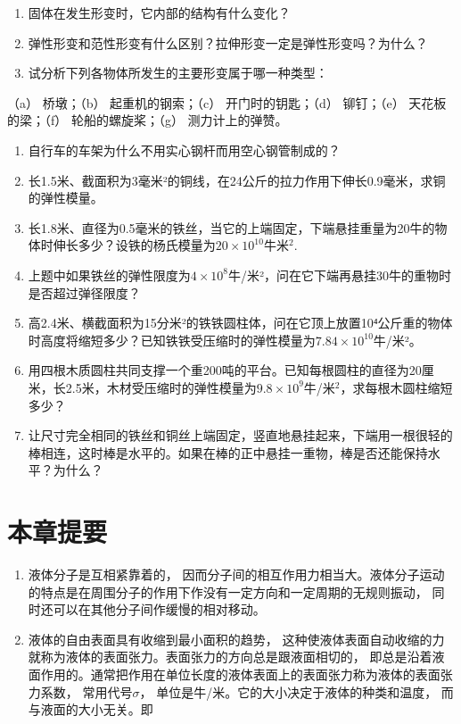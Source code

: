 \begin{enumerate}
\def\labelenumi{\arabic{enumi}.}
\item
  固体在发生形变时，它内部的结构有什么变化？
\item
  弹性形变和范性形变有什么区别？拉伸形变一定是弹性形变吗？为什么？
\item
  试分析下列各物体所发生的主要形变属于哪一种类型：
\end{enumerate}

（a） 桥墩；（b） 起重机的钢索；（c） 开门时的钥匙；（d） 铆钉；（e）
天花板的梁；（f） 轮船的螺旋桨；（g） 测力计上的弹赞。

\begin{enumerate}
\def\labelenumi{\arabic{enumi}.}
\setcounter{enumi}{3}
\item
  自行车的车架为什么不用实心钢杆而用空心钢管制成的？
\item
  长1.5米、截面积为3毫米²的铜线，在24公斤的拉力作用下伸长0.9毫米，求铜的弹性模量。
\item
  长1.8米、直径为0.5毫米的铁丝，当它的上端固定，下端悬挂重量为20牛的物体时伸长多少？设铁的杨氏模量为\(20\times10^{10}\)牛米\(^{2}\).
\item
  上题中如果铁丝的弹性限度为\(4 \times 10^{8}\)牛/米²，问在它下端再悬挂30牛的重物时是否超过弹径限度？
\item
  高2.4米、横截面积为15分米²的铁铁圆柱体，问在它顶上放置10⁴公斤重的物体时高度将缩短多少？已知铁铁受压缩时的弹性模量为\(7.84 \times 10^{10}\)牛/米²。
\item
  用四根木质圆柱共同支撑一个重200吨的平台。已知每根圆柱的直径为20厘米，长2.5米，木材受压缩时的弹性模量为\(9.8 \times 10^{9}\)牛/米\(^{2}\)，求每根木圆柱缩短多少？
\item
  让尺寸完全相同的铁丝和铜丝上端固定，竖直地悬挂起来，下端用一根很轻的棒相连，这时棒是水平的。如果在棒的正中悬挂一重物，棒是否还能保持水平？为什么？
\end{enumerate}

\section{本章提要}\label{ux672cux7ae0ux63d0ux8981-6}

\begin{enumerate}
\def\labelenumi{\arabic{enumi}.}
\item
  液体分子是互相紧靠着的，
  因而分子间的相互作用力相当大。液体分子运动的特点是在周围分子的作用下作没有一定方向和一定周期的无规则振动，
  同时还可以在其他分子间作缓慢的相对移动。
\item
  液体的自由表面具有收缩到最小面积的趋势，
  这种使液体表面自动收缩的力就称为液体的表面张力。表面张力的方向总是跟液面相切的，
  即总是沿着液面作用的。通常把作用在单位长度的液体表面上的表面张力称为液体的表面张力系数，
  常用代号\(\sigma\)， 单位是牛/米。它的大小决定于液体的种类和温度，
  而与液面的大小无关。即
\end{enumerate}

